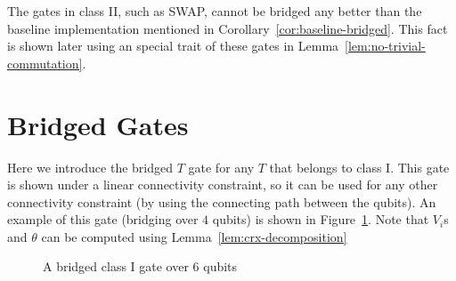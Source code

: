 The gates in class II, such as SWAP, cannot be bridged any better than the baseline implementation mentioned in Corollary~\ref{cor:baseline-bridged}. This fact is shown later using an special trait of these gates in Lemma~\ref{lem:no-trivial-commutation}.

\section{Bridged Gates}

Here we introduce the bridged $T$ gate for any $T$ that belongs to class I. This gate is shown under a linear connectivity constraint, so it can be used for any other connectivity constraint (by using the connecting path between the qubits). An example of this gate (bridging over $4$ qubits) is shown in Figure~\ref{fig:bridged-class-i}. Note that $V_i$s and $\theta$ can be computed using Lemma~\ref{lem:crx-decomposition}

\begin{figure}[h!]
  \label{fig:bridged-class-i}
  \centering
  \caption{A bridged class I gate over 6 qubits}
\end{figure}
  

